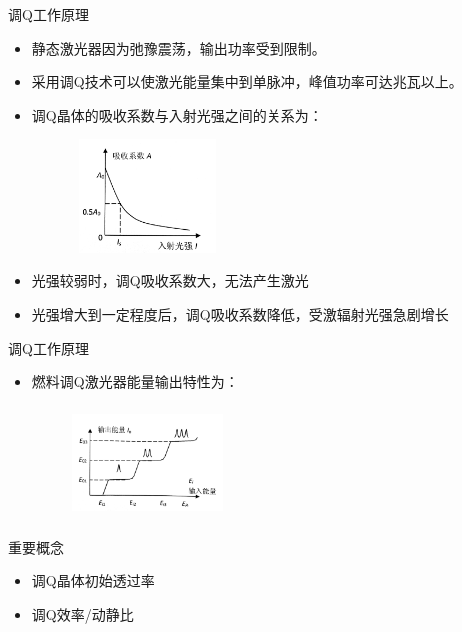 \documentclass{beamer}
\begin{document}
\begin{frame}{调Q工作原理}
  \begin{itemize}
    \item 静态激光器因为弛豫震荡，输出功率受到限制。
    \item 采用调Q技术可以使激光能量集中到单脉冲，峰值功率可达兆瓦以上。
    \item 调Q晶体的吸收系数与入射光强之间的关系为：
    \begin{figure}
      \includegraphics[height=3cm,width=4cm]{images/4.jpg}
      \label{fg2}
    \end{figure}
  \end{itemize}
  


  \begin{itemize}
    \item 光强较弱时，调Q吸收系数大，无法产生激光
    \item 光强增大到一定程度后，调Q吸收系数降低，受激辐射光强急剧增长
  \end{itemize}
  
\end{frame}

\begin{frame}{调Q工作原理}
  \begin{itemize}
    \item 燃料调Q激光器能量输出特性为：
    \begin{figure}
      \includegraphics[height=3cm,width=4cm]{images/5.jpg}
      \label{fg2}
    \end{figure}
  \end{itemize}
  

\begin{block}{重要概念}
  \begin{itemize}
    \item 调Q晶体初始透过率
    \item 调Q效率/动静比
  \end{itemize}
\end{block}
  
\end{frame}
\end{document}
